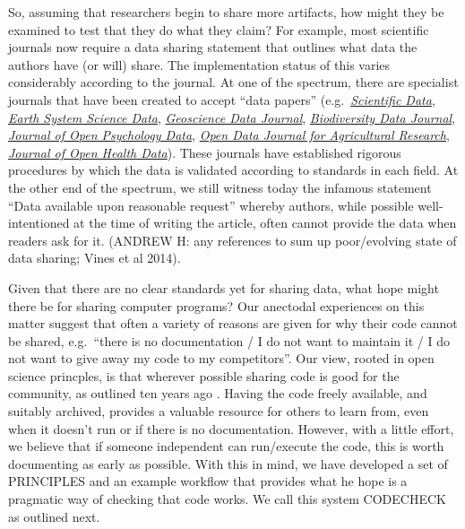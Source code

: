 \documentclass[12pt]{article}
\begin{document}
So, assuming that researchers begin to share more artifacts, how might
they be examined to test that they do what they claim? For example,
most scientific journals now require a data sharing statement that
outlines what data the authors have (or will) share. The
implementation status of this varies considerably according to the
journal. At one of the spectrum, there are specialist journals that
have been created to accept ``data papers'' (e.g.~\href{}{\emph{Scientific
  Data}}, 
\href{https://essd.copernicus.org/}{\emph{Earth System Science Data}}, 
\href{https://rmets.onlinelibrary.wiley.com/journal/20496060}{\emph{Geoscience Data Journal}},
\href{https://bdj.pensoft.net/}{\emph{Biodiversity Data Journal}},
\href{https://openpsychologydata.metajnl.com/}{\emph{Journal of Open Psychology Data}},
\href{https://odjar.org/}{\emph{Open Data Journal for Agricultural Research}},
\href{https://openhealthdata.metajnl.com}{\emph{Journal of Open Health Data}}).
These journals have established rigorous procedures by which
the data is validated according to standards in each field. At the
other end of the spectrum, we still witness today the infamous
statement ``Data available upon reasonable request'' whereby authors,
while possible well-intentioned at the time of writing the article,
often cannot provide the data when readers ask for
it.  (ANDREW H: any references to sum up poor/evolving state of data
sharing; Vines et al 2014).

Given that there are no clear standards yet for sharing data, what hope
might there be for sharing computer programs? Our anectodal experiences
on this matter suggest that often a variety of reasons are given for why
their code cannot be shared, e.g.~``there is no documentation / I do not
want to maintain it / I do not want to give away my code to my
competitors''. Our view, rooted in open science princples, is that
wherever possible sharing code is good for the community, as outlined
ten years ago \cite{Barnes2010-iv}. Having the code freely available, and
suitably archived, provides a valuable resource for others to learn
from, even when it doesn't run or if there is no documentation. However,
with a little effort, we believe that if someone independent can run/execute
the code, this is worth documenting as early as possible. With this in
mind, we have developed a set of PRINCIPLES and an example workflow that
provides what he hope is a pragmatic way of checking that code works. We
call this system CODECHECK as outlined next.
\end{document}
